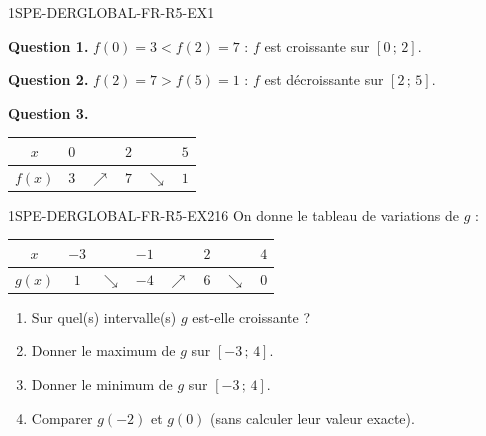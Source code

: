 \begin{corrige}{1SPE-DERGLOBAL-FR-R5-EX1}

\textbf{Question 1.}
$f(0) = 3 < f(2) = 7$ : $f$ est croissante sur $[0\,;\,2]$.

\textbf{Question 2.}
$f(2) = 7 > f(5) = 1$ : $f$ est décroissante sur $[2\,;\,5]$.

\textbf{Question 3.}


\begin{center}
\begin{tabular}{|c|ccccc|}
\hline
$x$ & $0$ & & $2$ & & $5$ \\
\hline
$f(x)$ & $3$ & $\nearrow$ & $7$ & $\searrow$ & $1$ \\
\hline
\end{tabular}
\end{center}

\end{corrige}


\begin{exercice}{1SPE-DERGLOBAL-FR-R5-EX2}{1}{6}
On donne le tableau de variations de $g$ :

\begin{center}
\begin{tabular}{|c|ccccccc|}
\hline
$x$ & $-3$ & & $-1$ & & $2$ & & $4$ \\
\hline
$g(x)$ & $1$ & $\searrow$ & $-4$ & $\nearrow$ & $6$ & $\searrow$ & $0$ \\
\hline
\end{tabular}
\end{center}

\begin{enumerate}
  \item Sur quel(s) intervalle(s) $g$ est-elle croissante ?
  \item Donner le maximum de $g$ sur $[-3\,;\,4]$.
  \item Donner le minimum de $g$ sur $[-3\,;\,4]$.
  \item Comparer $g(-2)$ et $g(0)$ (sans calculer leur valeur exacte).
\end{enumerate}
\end{exercice}


